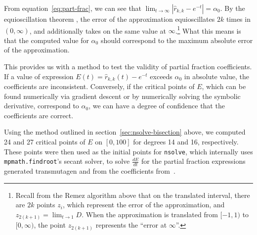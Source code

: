 From equation~\ref{eq:part-frac}, we can see that
$\lim_{t\to\infty}{\left|\hat{r}_{k,k} - e^{-t}\right|} = \alpha_0$. By the
equioscillation theorem , the error of the approximation equioscillates $2k$ times
in $(0, \infty)$, and additionally takes on the same value at $\infty$.\footnote{Recall
from the Remez algorithm above that on the translated interval, there are $2k$
points $z_i$, which represent the error of the approximation, and
$z_{2(k+1)}=\lim_{t\to 1}{D}$. When the approximation is translated from $[-1,
1)$ to $[0, \infty)$, the point $z_{2(k + 1)}$ represents the ``error at
$\infty$''.} What this means is that the computed value for $\alpha_0$ should
correspond to the maximum absolute error of the approximation.

This provides us with a method to test the validity of partial fraction
coefficients. If a value of expression $E(t) = \hat{r}_{k,k}(t) - e^{-t}$
exceeds $\alpha_0$ in absolute value, the coefficients are inconsistent.
Conversely, if the critical points of $E$, which can be found numerically via
gradient descent or by numerically solving the symbolic derivative, correspond
to $\alpha_0$, we can have a degree of confidence that the coefficients are
correct.

Using the method outlined in section~\ref{sec:nsolve-bisection} above, we
computed 24 and 27 critical points of $E$ on $[0, 100]$ for degrees 14 and 16,
respectively. These points were then used as the initial points for
\texttt{nsolve}, which internally uses \texttt{mpmath.findroot}'s secant
solver, to solve $\frac{dE}{dt}$ for the partial fraction expressions
generated transmutagen and from the coefficients
from~\cite{pusa2012correction}.

